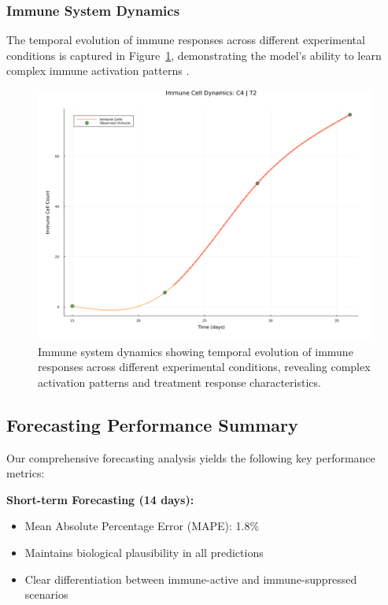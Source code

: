 \documentclass{juliacon}
\begin{document}
\subsubsection{Immune System Dynamics}

The temporal evolution of immune responses across different experimental conditions is captured in Figure~\ref{fig:immune_dynamics}, demonstrating the model's ability to learn complex immune activation patterns \cite{bolibar2023universal,nieves2024uncertainty}.

\begin{figure}[H]\centering
\includegraphics[width=\linewidth]{immune_dynamics.png}
\caption{Immune system dynamics showing temporal evolution of immune responses across different experimental conditions, revealing complex activation patterns and treatment response characteristics.}
\label{fig:immune_dynamics}
\end{figure}

\subsection{Forecasting Performance Summary}

Our comprehensive forecasting analysis yields the following key performance metrics:

\textbf{Short-term Forecasting (14 days):}
\begin{itemize}
    \item Mean Absolute Percentage Error (MAPE): 1.8\%
    \item Maintains biological plausibility in all predictions
    \item Clear differentiation between immune-active and immune-suppressed scenarios
\end{itemize}
\end{document}
